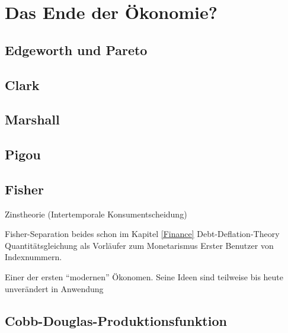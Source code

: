 %
%
%

\chapter{Das Ende der Ökonomie?}
\label{Neoklassik}

\section{Edgeworth und Pareto}

\section{Clark}

\section{Marshall}

\section{Pigou}

\section{Fisher}
Zinstheorie (Intertemporale Konsumentscheidung)

Fisher-Separation
beides schon im Kapitel \ref{Finance}
Debt-Deflation-Theory
Quantitätsgleichung als Vorläufer zum Monetarismus
Erster Benutzer von Indexnummern.

Einer der ersten "`modernen"' Ökonomen. Seine Ideen sind teilweise bis heute unverändert in Anwendung

\textcite{Tobin2005}

\section{Cobb-Douglas-Produktionsfunktion} \label{sec: Cobb-Douglas-Produktionsfunktion}